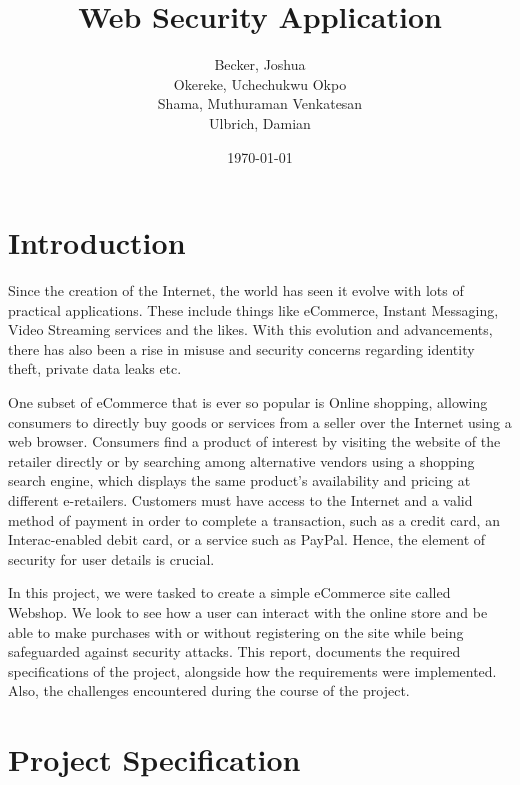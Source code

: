 \documentclass[12pt,a4paper]{article}
\begin{document}
	
	\title{Web Security Application}
	\author{Becker, Joshua\\ Okereke, Uchechukwu Okpo\\ Shama, Muthuraman Venkatesan\\ Ulbrich, Damian}
	\date{\today}
	\maketitle
	\clearpage
	
	
	\tableofcontents
	\clearpage
	
	\section{Introduction}
	
	
	\begin{flushleft}
	Since the creation of the Internet, the world has seen it evolve with lots of practical applications. These include things like eCommerce, Instant Messaging, Video Streaming services and the likes. With this evolution and advancements, there has also been a rise in misuse and security concerns regarding identity theft, private data leaks etc.
	
		
	One subset of eCommerce that is ever so popular is Online shopping, allowing consumers to directly buy goods or services from a seller over the Internet using a web browser. Consumers find a product of interest by visiting the website of the retailer directly or by searching among alternative vendors using a shopping search engine, which displays the same product's availability and pricing at different e-retailers. Customers must have access to the Internet and a valid method of payment in order to complete a transaction, such as a credit card, an Interac-enabled debit card, or a service such as PayPal. Hence, the element of security for user details is crucial.
	
	
	In this project, we were tasked to create a simple eCommerce site called Webshop. We look to see how a user can interact with the online store and be able to make purchases with or without registering on the site while being safeguarded against security attacks. This report, documents the required specifications of the project, alongside how the requirements were implemented. Also, the challenges encountered during the course of the project.
	
	
	\end{flushleft}
	\section{Project Specification}
	
\end{document}
